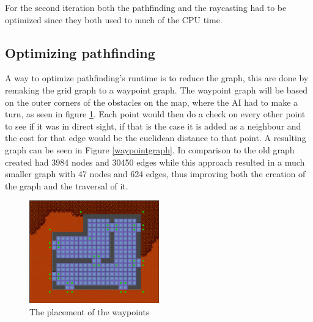For the second iteration both the pathfinding and the raycasting had to be optimized since they both used to much of the CPU time.

\subsection*{Optimizing pathfinding}
A way to optimize pathfinding's runtime is to reduce the graph, this are done by remaking the grid graph to a waypoint graph.
The waypoint graph will be based on the outer corners of the obstacles on the map, where the AI had to make a turn, as seen in figure \ref{waypointsNode}.
Each point would then do a check on every other point to see if it was in direct sight, if that is the case it is added as a neighbour and the cost for that edge would be the euclidean distance to that point.
A resulting graph can be seen in Figure \ref{waypointgraph}.
In comparison to the old graph created had 3984 nodes and 30450 edges while this approach resulted in a much smaller graph with 47 nodes and 624 edges, thus improving both the creation of the graph and the traversal of it.

\begin{figure}[H]
\begin{center}
	\includegraphics[width=0.5\textwidth]{figures/astar/waypoints}
	\caption{The placement of the waypoints}
	\label{waypointsNode}
	\end{center}
\end{figure}

